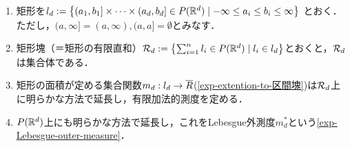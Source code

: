 \documentclass[uplatex, dvipdfmx]{jsreport}
\begin{document}
\begin{notation}[矩形／区間，矩形塊]\mbox{}
    \begin{enumerate}
        \item 矩形を$l_d:=\left\{(a_1,b_1]\times\cdots\times(a_d,b_d]\in P(\mathbb{R}^d)\mid-\infty\le a_i\le b_i\le\infty\right\}$
        とおく．ただし，$(a,\infty]=(a,\infty),(a,a]=\emptyset$とみなす．
        \item 矩形塊（＝矩形の有限直和）$\mathcal{R}_d:=\left\{\sum_{i=1}^nl_i\in P(\mathbb{R}^d)\mid l_i\in l_d\right\}$とおくと，$\mathcal{R}_d$は集合体である．
        \item 矩形の面積が定める集合関数$m_d:l_d\to\overline{R}$(\ref{exp-extention-to-区間塊})は$\mathcal{R}_d$上に明らかな方法で延長し，有限加法的測度を定める．
        \item $P(\mathbb{R}^d)$上にも明らかな方法で延長し，これをLebesgue外測度$m^*_d$という\ref{exp-Lebesgue-outer-measure}．
    \end{enumerate}
\end{notation}
\end{document}

